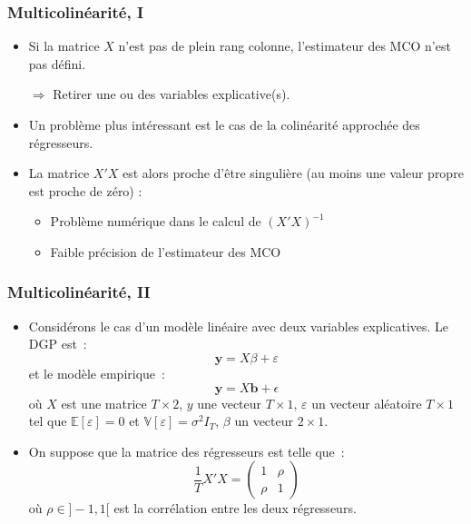 \documentclass[10pt]{beamer}
\theoremstyle{plain}
\begin{document}
\begin{frame}
  \frametitle{Multicolinéarité, I}

  \begin{itemize}

  \item Si la matrice $X$ n'est pas de plein rang colonne, l'estimateur des MCO n'est pas défini.\newline

  \item[$\Rightarrow$] Retirer une ou des variables explicative(s).\newline

  \item Un problème plus intéressant est le cas de la colinéarité approchée des régresseurs.\newline

  \item La matrice $X'X$ est alors proche d'être singulière (au moins une valeur propre est proche de zéro) :\newline

    \begin{itemize}
    \item Problème numérique dans le calcul de $(X'X)^{-1}$\newline
    \item Faible précision de l'estimateur des MCO\newline
    \end{itemize}

  \end{itemize}

\end{frame}


\begin{frame}
  \frametitle{Multicolinéarité, II}

  \begin{itemize}

  \item Considérons le cas d'un modèle linéaire avec deux variables explicatives. Le DGP est~:
    \[
      \mathbf y = X\beta + \varepsilon
    \]
    et le modèle empirique~:
    \[
      \mathbf y = X \mathbf{b} + \epsilon
    \]
    où $X$ est une matrice $T\times 2$, $y$ une
    vecteur $T\times 1$, $\varepsilon$ un vecteur
    aléatoire $T\times 1$ tel que $\mathbb E[\varepsilon] = 0$
    et $\mathbb V[\varepsilon] = \sigma^2I_T$, $\beta$ un
    vecteur $2\times 1$.\newline

  \item On suppose que la matrice des régresseurs est telle que~:
    \[
      \frac{1}{T} X'X =
      \begin{pmatrix}
        1 & \rho \\
        \rho & 1
      \end{pmatrix}
    \]
    où $\rho\in]-1,1[$ est la corrélation entre les deux régresseurs.\newline

    \end{itemize}

  \end{frame}
\end{document}
